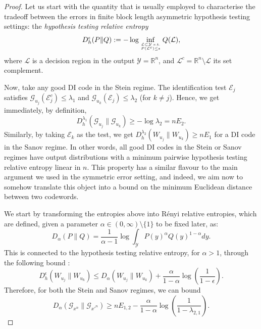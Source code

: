 \documentclass[10pt,conference]{IEEEtran}
\newcommand{\1}{\mathds{1}}
\newcommand{\RR}{\mathbb{R}}
\newcommand{\cE}{\mathcal{E}}
\newcommand{\cG}{\mathcal{G}}
\newcommand{\cL}{\mathcal{L}}
\newcommand{\cY}{\mathcal{Y}}
\newcommand{\ox}{\otimes}
\begin{document}
\begin{proof}
Let us start with the quantity that is usually employed to characterise the tradeoff between the errors in finite block length asymmetric hypothesis testing settings: the \emph{hypothesis testing relative entropy}
\begin{equation}\label{eq:HTREntopy}
  D_h^\epsilon(P\|Q) 
    := -\log\inf_{\cL\subset\cY \text{ s.t.}\atop P(\cL^c)\leq\epsilon} Q(\cL),
\end{equation}
where $\cL$ is a decision region in the output $\cY=\RR^n$, and $\cL^c = \RR^n\setminus\cL$ its set complement. 

Now, take any good DI code in the Stein regime. The identification test $\cE_j$ satisfies $\cG_{u_j}(\cE_j^c) \leq \lambda_1$ and $\cG_{u_k}(\cE_j) \leq \lambda_2$ (for $k\neq j$). Hence, we get immediately, by definition,
\begin{equation*}
  D_h^{\lambda_1}(\cG_{u_j}\|\cG_{u_k}) \geq 
  -\log\lambda_2 = nE_2.
\end{equation*}
Similarly, by taking $\cE_k$ as the test, we get $D_h^{\lambda_2}(W_{u_j}\|W_{u_k}) \geq nE_1$ for a DI code in the Sanov regime. In other words, all good DI codes in the Stein or Sanov regimes have output distributions with a minimum pairwise hypothesis testing relative entropy linear in $n$. This property has a similar flavour to the main argument we used in the symmetric error setting, and indeed, we aim now to somehow translate this object into a bound on the minimum Euclidean distance between two codewords.

We start by transforming the entropies above into R\'enyi relative entropies, which are defined, given a parameter $\alpha\in(0,\infty)\setminus\{1\}$ to be fixed later, as:
\begin{equation}\label{eq:Renyi_def}
D_\alpha(P\|Q)=\frac{1}{\alpha-1}\log\int_{\cY}P(y)^\alpha Q(y)^{1-\alpha}dy.
\end{equation}
This is connected to the hypothesis testing relative entropy, for $\alpha>1$, through the following bound \cite{CMW16:Dh-to-D_alpha}:
\begin{equation*}
\!\!D_h^{\epsilon}(W_{u_j}\|W_{u_k})\!\leq\! D_\alpha (W_{u_j}\|W_{u_k})+\frac{\alpha}{1-\alpha}\log\left(\!\frac{1}{1-\epsilon}\!\right).
\end{equation*}
Therefore, for both the Stein and Sanov regimes, we can bound
\begin{equation}
  \label{eq:Renyi_converse_bound}
  D_\alpha(\cG_{x^n}\|\cG_{x'^n})
    \geq nE_{1,2}-\frac{\alpha}{1-\alpha} \log\left(\frac{1}{1-\lambda_{2,1}}\right).
\end{equation}


\end{proof}
\end{document}
